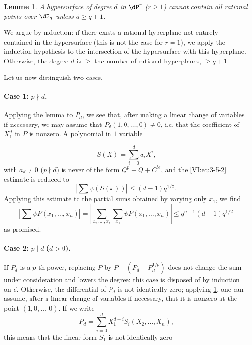 \documentclass[oneside]{book}
\theoremstyle{sga-source}
\theoremstyle{sga-source-dash}
\theoremstyle{sga-source-dotdash}
\theoremstyle{sga-source-number-note-dash}
\theoremstyle{sga-source-note-number-dotdash}
\theoremstyle{sga-source-example-dotdash}
\theoremstyle{sga-source-inline-number}
\theoremstyle{sga-source-bare-number}
\theoremstyle{sga-source}
\newtheorem{lemma_}[subsection]{Lemme}
\newcommand{\PrintPage}[1]{}\newcommand{\MathPage}[1]{}\newcommand{\PrintCite}[2]{#1}\newcommand{\var}[3]{#2}
\begin{document}
\begin{lemma_}\label{VI:3-9}
A hypersurface of degree $d$ in $\dP^r$ (\var{$r\geqslant i$}{$r\geqslant 1$}{S45-SOL-0786}) cannot contain 
all rational points over $\dF_q$ unless $d\geqslant q+1$. 
\end{lemma_}

We argue by induction: if there exists a rational hyperplane not 
entirely contained in the hypersurface (this is not the case for $r=1$), we 
apply the induction hypothesis to the intersection of the hypersurface with this 
hyperplane. Otherwise, the degree $d$ is $\geqslant$ the number of rational 
hyperplanes, $\geqslant q+1$. 

Let us now distinguish two cases. 


\paragraph{Case 1: $p\nmid d$.}
Applying the lemma to $P_d$, we see that, after making a linear change 
of variables if necessary, we may assume that $P_d(1,0,\ldots,0)\ne 0$, i.e. 
that the coefficient of $X_1^d$ in $P$ is nonzero. A polynomial in $1$ 
variable 
\PrintPage{194}
\[
  S(X) = \sum_{i=0}^d a_i X^i \text{,} 
\]
with $a_d\ne 0$ ($p\nmid d$) is never of the form $Q^p-Q+C^{t e}$, and 
the \eqref{VI:eq:3-5-2} estimate is reduced to 
\[
  \left| \sum \psi(S(x)) \right| \leqslant (d-1) q^{1/2} \text{.} 
\]
Applying this estimate to the partial sums obtained by varying 
only $x_1$, we find 
\[
  \left| \sum \psi P(x_1,\dots,x_n) \right| = \left| \var{\sum_{x_2,\dots,x_n} \sum_{x_1} \psi P(x_1,\dots,x_n\right|}{\sum_{x_2,\dots,x_n} \sum_{x_1} \psi P(x_1,\dots,x_n)\right|}{S45-SOL-0792} \leqslant q^{n-1} (d-1) q^{1/2} 
\]
as promised. 


\paragraph{Case 2: $p\mid d$ ($d>0$).}
If $P_d$ is a $p$-th power, replacing $P$ by $P-(P_d-P_d^{1/p})$ 
does not change the sum under consideration and lowers the degree: this case 
is disposed of by induction on $d$. Otherwise, the differential of 
$P_d$ is not identically zero; applying \ref{VI:3-9}, one can assume, 
after a linear change of variables if necessary, that it is nonzero 
at the point $(1,0,\dots,0)$. If we write 
\[
  P_d = \sum_{i=0}^d X_1^{d-i} S_i(X_2,\dots,X_n) \text{,} 
\]
this means that the linear form $S_1$ is not identically zero. 
\end{document}
